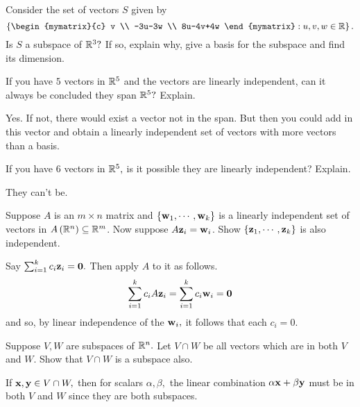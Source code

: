 \begin{enumialphparenastyle}
\begin{ex} Consider the set of vectors $S$ given by  
\begin{equation*}
\left\{ \begin{mymatrix}{c}
v \\ 
-3u-3w \\ 
8u-4v+4w
\end{mymatrix} :u,v,w\in \R\right\} .
\end{equation*}
Is $S$ a subspace of $\mathbb{R}^{3}?$ If so, explain why,
give a basis for the subspace and find its dimension.
\end{ex}

\begin{ex} If you have $5$ vectors in $\mathbb{R}^{5}$ and the vectors are
linearly independent, can it always be concluded they span $\mathbb{R}^{5}?$
Explain. 
\begin{sol}
 Yes. If not, there would exist a vector not in the span. But then
you could add in this vector and obtain a linearly independent set of
vectors with more vectors than a basis.
\end{sol}
\end{ex}

\begin{ex} If you have $6$ vectors in $\mathbb{R}^{5},$ is it possible they are
linearly independent? Explain.
\begin{sol}
They can't be.
\end{sol}
\end{ex}


\begin{ex} Suppose $A$ is an $m\times n$ matrix and $\left\{ {\bf w}
_{1},\cdots ,{\bf w}_{k}\right\} $ is a linearly independent set of
vectors in $A\left( \mathbb{R}^{n}\right) \subseteq \mathbb{R}^{m}$. Now
suppose $A{\bf z}_{i}={\bf w}_{i}$. Show $\left\{ 
{\bf z}_{1},\cdots ,{\bf z}_{k}\right\} $ is also independent. 
\begin{sol}
 Say $
\sum_{i=1}^{k}c_{i}{\bf z}_{i}={\bf 0}.$ Then apply $A$ to it as follows.
\[
\sum_{i=1}^{k}c_{i}A{\bf z}_{i}=\sum_{i=1}^{k}c_{i}{\bf w}_{i}={\bf 0}
\]
and so, by linear independence of the ${\bf w}_{i},$ it follows that each
$c_{i}=0$.
\end{sol}
\end{ex}

\begin{ex} Suppose $V, W$ are subspaces of $\mathbb{R}^{n}.$ Let $V\cap W$
be all vectors which are in both $V$ and $W$. Show that $V \cap W$ is a subspace also. 
\begin{sol}
If ${\bf x}, {\bf y}\in V\cap W,$ then for scalars $\alpha
,\beta ,$ the linear combination $\alpha {\bf x}+\beta {\bf y}$ must
be in both $V$ and $W$ since they are both subspaces.
\end{sol}
\end{ex}


\end{enumialphparenastyle}
